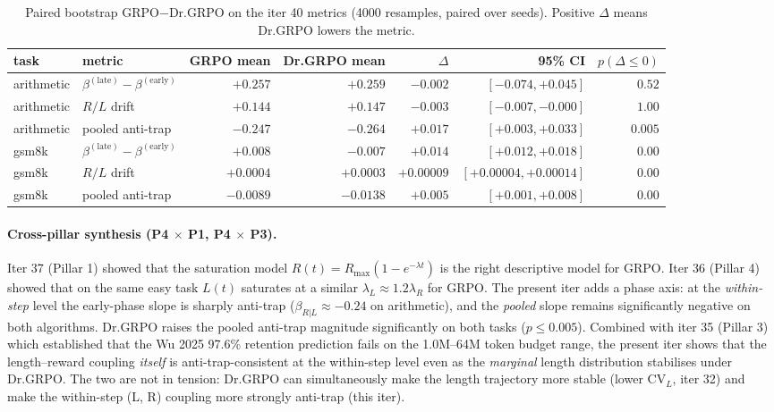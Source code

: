 \begin{table}[t]
\centering
\small
\caption{Paired bootstrap GRPO$-$Dr.GRPO on the iter 40 metrics
(4000 resamples, paired over seeds).  Positive $\Delta$ means
Dr.GRPO lowers the metric.}
\label{tab:length-iter40-cross}
\begin{tabular}{llrrrrr}
\toprule
task & metric & GRPO mean & Dr.GRPO mean & $\Delta$ & 95\% CI & $p(\Delta\le 0)$ \\
\midrule
arithmetic & $\beta^{(\mathrm{late})}{}-\beta^{(\mathrm{early})}$ & $+0.257$ & $+0.259$ & $-0.002$ & $[-0.074, +0.045]$ & $0.52$ \\
arithmetic & $R/L$ drift & $+0.144$ & $+0.147$ & $-0.003$ & $[-0.007, -0.000]$ & $1.00$ \\
arithmetic & pooled anti-trap & $-0.247$ & $-0.264$ & $+0.017$ & $[+0.003, +0.033]$ & $0.005$ \\
gsm8k & $\beta^{(\mathrm{late})}{}-\beta^{(\mathrm{early})}$ & $+0.008$ & $-0.007$ & $+0.014$ & $[+0.012, +0.018]$ & $0.00$ \\
gsm8k & $R/L$ drift & $+0.0004$ & $+0.0003$ & $+0.00009$ & $[+0.00004, +0.00014]$ & $0.00$ \\
gsm8k & pooled anti-trap & $-0.0089$ & $-0.0138$ & $+0.005$ & $[+0.001, +0.008]$ & $0.00$ \\
\bottomrule
\end{tabular}
\end{table}

\paragraph{Cross-pillar synthesis (P4 $\times$ P1, P4 $\times$ P3).}
Iter 37 (Pillar 1) showed that the saturation model
$R(t) = R_{\max}(1 - e^{-\lambda t})$ is the right descriptive model
for GRPO.  Iter 36 (Pillar 4) showed that on the same easy task
$L(t)$ saturates at a similar $\lambda_L \approx 1.2 \lambda_R$ for
GRPO.  The present iter adds a phase axis: at the \emph{within-step}
level the early-phase slope is sharply anti-trap ($\beta_{R|L}
\approx -0.24$ on arithmetic), and the \emph{pooled} slope remains
significantly negative on both algorithms.  Dr.GRPO raises the
pooled anti-trap magnitude significantly on both tasks ($p \le 0.005$).
Combined with iter 35 (Pillar 3) which established that the Wu 2025
97.6\% retention prediction fails on the 1.0M--64M token budget
range, the present iter shows that the length--reward coupling
\emph{itself} is anti-trap-consistent at the within-step level even
as the \emph{marginal} length distribution stabilises under Dr.GRPO.
The two are not in tension: Dr.GRPO can simultaneously make the
length trajectory more stable (lower CV$_L$, iter 32) and make the
within-step (L, R) coupling more strongly anti-trap (this iter).

